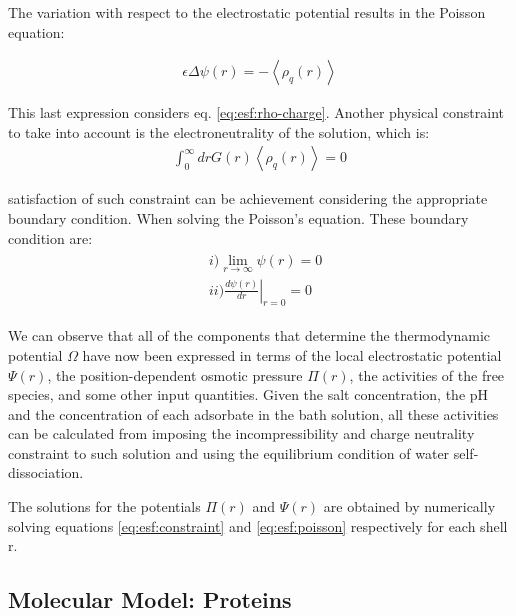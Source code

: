 	The variation with respect to the electrostatic potential results in the Poisson equation:
	
	\begin{align}
		\epsilon\Delta\psi(r) = -\left<\rho_q(r)\right>
		\label{eq:esf:poisson}
	\end{align}
	
	This last expression considers eq. \ref{eq:esf:rho-charge}. Another physical constraint to take into account is the electroneutrality of the solution, which is:
	\begin{align}
		\int_0^\infty{drG(r) \left<\rho_q(r)\right>} = 0
	\end{align}
	
	satisfaction of such constraint can be achievement considering the appropriate boundary condition.
	When solving the Poisson's equation. These boundary condition are:
	\begin{align}
		\begin{aligned}
			&i)  \lim_{r\to\infty}\psi(r) = 0 \\
			&ii) \left.\frac{d\psi(r)}{dr}\right|_{r=0} = 0
			\label{eq:esf:contorno}
		\end{aligned}
	\end{align}
	
	
	We can observe that all of the components that determine the thermodynamic potential $\Omega$ have now been expressed in terms of the local electrostatic potential $\Psi(r)$, the position-dependent osmotic pressure $\Pi(r)$, the activities of the free species, and some other input quantities. Given the salt concentration, the pH and the concentration of each adsorbate in the bath solution, all these activities can be calculated from imposing the incompressibility and charge neutrality constraint to such solution and using the equilibrium condition of water self-dissociation. 
	
	The solutions for the potentials $\Pi(r)$ and $\Psi(r)$ are obtained by numerically solving equations \ref{eq:esf:constraint} and \ref{eq:esf:poisson} respectively for each shell r.










\subsection{Molecular Model: Proteins}\label{sect:protein}


